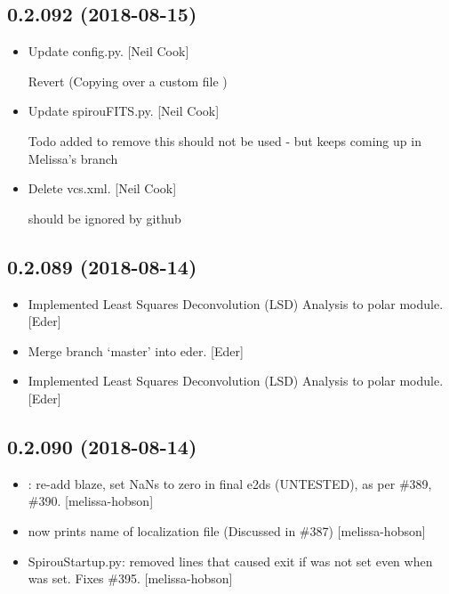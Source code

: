 \documentclass[a4paper,10pt,english]{report}
\begin{document}
\subsection{0.2.092 (2018-08-15)}
\label{\detokenize{misc/changelog:id370}}\begin{itemize}
\item {} 
Update config.py. {[}Neil Cook{]}

Revert  (Copying over a custom  file )

\item {} 
Update spirouFITS.py. {[}Neil Cook{]}

Todo added to remove  this should not be used - but keeps coming up in Melissa’s branch

\item {} 
Delete vcs.xml. {[}Neil Cook{]}

should be ignored by github

\end{itemize}


\subsection{0.2.089 (2018-08-14)}
\label{\detokenize{misc/changelog:id371}}\begin{itemize}
\item {} 
Implemented Least Squares Deconvolution (LSD) Analysis to polar
module. {[}Eder{]}

\item {} 
Merge branch ‘master’ into eder. {[}Eder{]}

\item {} 
Implemented Least Squares Deconvolution (LSD) Analysis to polar
module. {[}Eder{]}

\end{itemize}


\subsection{0.2.090 (2018-08-14)}
\label{\detokenize{misc/changelog:id372}}\begin{itemize}
\item {} 
: re-add blaze, set NaNs to zero in final e2ds
(UNTESTED), as per \#389, \#390. {[}melissa-hobson{]}

\item {} 
 now prints name of localization file (Discussed in
\#387) {[}melissa-hobson{]}

\item {} 
SpirouStartup.py: removed lines that caused exit if  was not
set even when  was set. Fixes \#395. {[}melissa-hobson{]}

\end{itemize}
\end{document}
